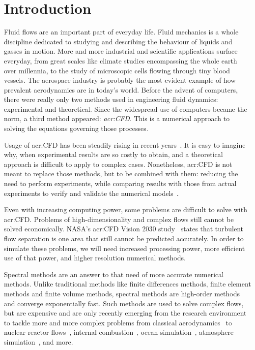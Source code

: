 \chapter{Introduction}

Fluid flows are an important part of everyday life. Fluid mechanics is a whole discipline dedicated
to studying and describing the behaviour of liquids and gasses in motion. More and more industrial
and scientific applications surface everyday, from great scales like climate studies encompassing
the whole earth over millennia, to the study of microscopic cells flowing through tiny blood
vessels. The aerospace industry is probably the most evident example of how prevalent aerodynamics
are in today's world. Before the advent of computers, there were really only two methods used in
engineering fluid dynamics: experimental and theoretical. Since the widespread use of computers
became the norm, a third method appeared: \textit{\acrfull{acr:CFD}}. This is a numerical approach
to solving the equations governing those processes.

Usage of \acrshort{acr:CFD} has been steadily rising in recent years~\cite{Slotnick2014}. It is easy
to imagine why, when experimental results are so costly to obtain, and a theoretical approach is
difficult to apply to complex cases. Nonetheless, \acrshort{acr:CFD} is not meant to replace those
methods, but to be combined with them: reducing the need to perform experiments, while comparing
results with those from actual experiments to verify and validate the numerical
models~\cite{Stern2001}.

Even with increasing computing power, some problems are difficult to solve with \acrshort{acr:CFD}.
Problems of high-dimensionality and complex flows still cannot be solved economically. NASA's
\acrshort{acr:CFD} Vision 2030 study~\cite{Slotnick2014} states that turbulent flow separation is
one area that still cannot be predicted accurately. In order to simulate these problems, we will
need increased processing power, more efficient use of that power, and higher resolution numerical
methods.

Spectral methods are an answer to that need of more accurate numerical methods. Unlike traditional
methods like finite differences methods, finite element methods and finite volume methods, spectral
methods are high-order methods and converge exponentially fast. Such methods are used to solve
complex flows, but are expensive and are only recently emerging from the research environment to
tackle more and more complex problems from classical aerodynamics~\cite{Vadsola2021} to nuclear
reactor flows~\cite{Merzari2017}, internal combustion~\cite{Wu2021}, ocean
simulation~\cite{Molcard2002}, atmosphere simulation~\cite{Haidvogel1997}, and more. 


